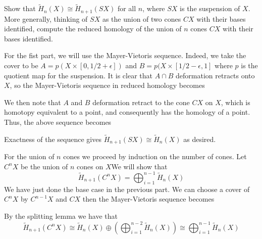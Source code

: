 \documentclass{article}
\begin{document}
\begin{problem}{2}{\parindent}
  Show that $\tilde{H}_n(X) \cong \tilde{H}_{n+1}(SX)$ for all $n$,
  where $SX$ is the suspension of $X$. More generally, thinking of
  $SX$ as the union of two cones $CX$ with their bases identified,
  compute the reduced homology of the union of $n$ cones $CX$ with
  their bases identified.
\end{problem}
\begin{solution}{\parindent}
  For the fist part, we will use the Mayer-Vietoris sequence. Indeed,
  we take the cover to be $A = p(X \times [0,1/2 + \epsilon])$ and $B
  = p(X \times [1/2-\epsilon, 1]$ where $p$ is the quotient map for
  the suspension. It is clear that $A \cap B$ deformation retracts
  onto $X$, so the Mayer-Vietoris sequence in reduced homology becomes
  \begin{center}
  \end{center}
  We then note that $A$ and $B$ deformation retract to the cone $CX$
  on $X$, which is homotopy equivalent to a point, and consequently
  has the homology of a point. Thus, the above sequence becomes
  \begin{center}
  \end{center}
  Exactness of the sequence gives $\tilde{H}_{n+1}(SX) \cong
  \tilde{H}_{n}(X)$ as desired.

  For the union of $n$ cones we proceed by induction on the number of
  cones. Let $C^{n}X$ be the union of $n$ cones on $X$We will show
  that
  \[
  \tilde{H}_{n+1}(C^nX) = \bigoplus_{i=1}^{n-1} \tilde{H}_{n}(X)
  \]
  We have just done the base case in the previous part. We can choose
  a cover of $C^{n}X$ by $C^{n-1}X$ and $CX$ then the Mayer-Vietoris
  sequence becomes
  \begin{center}
  \end{center}
  By the splitting lemma we have that
  \[
  \tilde{H}_{n+1}(C^nX) \cong \tilde{H}_{n}(X) \oplus
  \left(\bigoplus_{i=1}^{n-2} \tilde{H}_{n}(X)\right) \cong
  \bigoplus_{i=1}^{n-1} \tilde{H}_{n}(X)
  \]
\end{solution}
\end{document}
